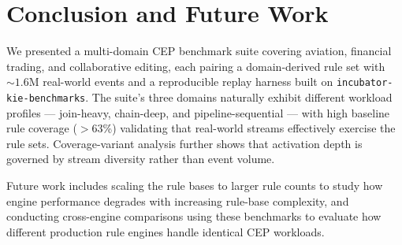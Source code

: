 
\section{Conclusion and Future Work}\label{sec:conclusion}

We presented a multi-domain CEP benchmark suite covering aviation, financial trading, and collaborative editing, each pairing a domain-derived rule set with ${\sim}1.6$M real-world events and a reproducible replay harness built on \texttt{incubator-kie-benchmarks}. The suite's three domains naturally exhibit different workload profiles --- join-heavy, chain-deep, and pipeline-sequential --- with high baseline rule coverage ($>$63\%) validating that real-world streams effectively exercise the rule sets. Coverage-variant analysis further shows that activation depth is governed by stream diversity rather than event volume.

Future work includes scaling the rule bases to larger rule counts to study how engine performance degrades with increasing rule-base complexity, and conducting cross-engine comparisons using these benchmarks to evaluate how different production rule engines handle identical CEP workloads.
